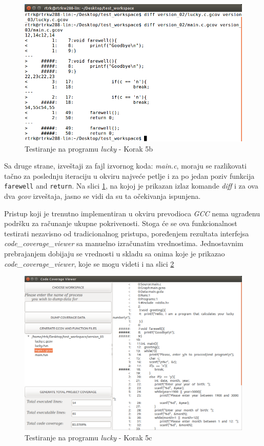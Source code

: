 \documentclass[12pt,oneside]{memoir}
\newcommand{\kod}[1]{\texttt{#1}}
\newcommand{\strano}[1]{\textit{#1}}
\begin{document}
\begin{figure}[!ht]
  \centering
  \includegraphics[width=\textwidth]{img/lucky6-ng.png}
  \caption{Testiranje na programu \strano{lucky} - Korak 5b}
  \label{fig:lucky-test-6}
\end{figure}

Sa druge strane, izveštaji za fajl izvornog koda: \strano{main.c}, moraju se razlikovati tačno za poslednju iteraciju u okviru najveće petlje i za po jedan poziv funkcija \kod{farewell} and \kod{return}. Na slici \ref{fig:lucky-test-6}, na kojoj je prikazan izlaz komande \strano{diff} i za ova dva \strano{gcov} izveštaja, jasno se vidi da su ta očekivanja ispunjena. 

Pristup koji je trenutno implementiran u okviru prevodioca \strano{GCC} nema ugrađenu podršku za računanje ukupne pokrivenosti. Stoga će se ova funkcionalnost testirati nezavisno od tradicionalnog pristupa, poređenjem rezultata interfejsa \\ \strano{code\_coverage\_viewer} sa manuelno izračunatim vrednostima. Jednostavnim prebrajanjem dobijaju se vrednosti u skladu sa onima koje je prikazao \\ \strano{code\_coverage\_viewer}, koje se mogu videti i na slici \ref{fig:lucky-test-7}

\begin{figure}[!ht]
  \centering
  \includegraphics[width=\textwidth]{img/lucky7-ng-ng.png}
  \caption{Testiranje na programu \strano{lucky} - Korak 5c}
  \label{fig:lucky-test-7}
\end{figure}
\end{document}
